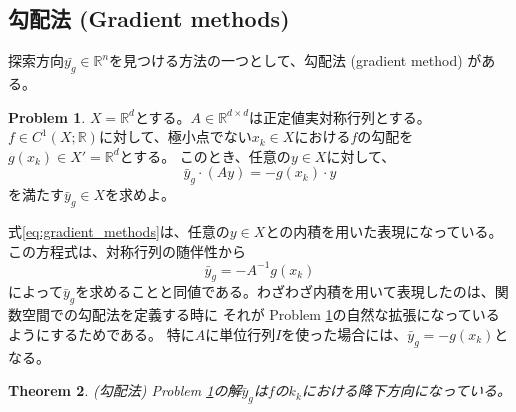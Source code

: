\documentclass[a4paper,11pt]{jsarticle}
\newtheorem{thm}{Theorem}[section]
\theoremstyle{definition}
\newtheorem{problem}[thm]{Problem}
\newcommand{\RealNumberSet}{\mathbb{R}}
\begin{document}
\subsection{勾配法 (Gradient methods)}

探索方向$\bar{y_{g}} \in \RealNumberSet^n$を見つける方法の一つとして、勾配法 (gradient method) がある。

\begin{problem}
\label{prob:gradient_methods}
$X = \RealNumberSet^d$とする。$A \in \RealNumberSet^{d \times d}$は正定値実対称行列とする。
$f \in C^1 (X;\RealNumberSet)$に対して、極小点でない$x_k \in X$における$f$の勾配を$g(x_k) \in X' = \RealNumberSet^d$とする。
このとき、任意の$y \in X$に対して、
\begin{equation}
  \label{eq:gradient_methods}
  \bar{y}_{g} \cdot (Ay) = -g(x_k) \cdot y \tag{3.2.3}
\end{equation}
を満たす$\bar{y}_{g} \in X$を求めよ。
\end{problem}
式\eqref{eq:gradient_methods}は、任意の$y \in X$との内積を用いた表現になっている。この方程式は、対称行列の随伴性から
\begin{equation}
  \label{eq:gradient_methods_2}
  \bar{y}_{g} = -A^{-1} g(x_k) \tag{3.2.4}
\end{equation}
によって$\bar{y}_{g}$を求めることと同値である。わざわざ内積を用いて表現したのは、関数空間での勾配法を定義する時に
それが Problem \ref{prob:gradient_methods}の自然な拡張になっているようにするためである。
特に$A$に単位行列$I$を使った場合には、$\bar{y}_{g} = -g(x_k)$となる。

\begin{thm}{(勾配法)}
  Problem \ref{prob:gradient_methods}の解$\bar{y}_{g}$は$f$の$k_{k}$における降下方向になっている。
\end{thm}
\end{document}
